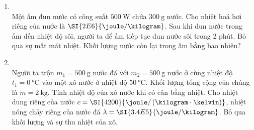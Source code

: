 \begin{enumerate}[label=\bfseries Câu \arabic*:, leftmargin=1.7cm]
\item{}\\
Một ấm đun nước có công suất $\SI{500}{\watt}$ chứa $\SI{300}{\gram}$ nước. Cho nhiệt hoá hơi riêng của nước là $\SI{2E6}{\joule/\kilogram}$. Sau khi đun nước trong ấm đến nhiệt độ sôi, người ta để ấm tiếp tục đun nước sôi trong 2 phút. Bỏ qua sự mất mát nhiệt. Khối lượng nước còn lại trong ấm bằng bao nhiêu?

\item {}\\
Người ta trộn $m_1=\SI{500}{\gram}$ nước đá với $m_2=\SI{500}{\gram}$ nước ở cùng nhiệt độ $t_1=\SI{0}{\celsius}$ vào một xô nước ở nhiệt độ $\SI{50}{\celsius}$. Khối lượng tổng cộng của chúng là $m=\SI{2}{\kilogram}$. Tính nhiệt độ của xô nước khi có cân bằng nhiệt. Cho nhiệt dung riêng của nước $c=\SI{4200}{\joule/\left(\kilogram\cdot\kelvin\right)}$, nhiệt nóng chảy riêng của nước đá $\lambda=\SI{3.4E5}{\joule/\kilogram}$. Bỏ qua khối lượng và sự thu nhiệt của xô.


\end{enumerate}
